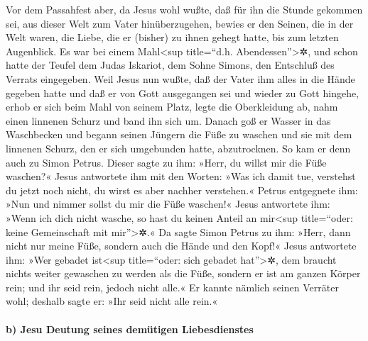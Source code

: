  Vor dem Passahfest aber, da Jesus wohl wußte, daß für ihn
die Stunde gekommen sei, aus dieser Welt zum Vater hinüberzugehen,
bewies er den Seinen, die in der Welt waren, die Liebe, die er (bisher)
zu ihnen gehegt hatte, bis zum letzten Augenblick.  Es war
bei einem Mahl\textless sup title=``d.h. Abendessen''\textgreater✲, und
schon hatte der Teufel dem Judas Iskariot, dem Sohne Simons, den
Entschluß des Verrats eingegeben.  Weil Jesus nun wußte,
daß der Vater ihm alles in die Hände gegeben hatte und daß er von Gott
ausgegangen sei und wieder zu Gott hingehe,  erhob er sich
beim Mahl von seinem Platz, legte die Oberkleidung ab, nahm einen
linnenen Schurz und band ihn sich um.  Danach goß er
Wasser in das Waschbecken und begann seinen Jüngern die Füße zu waschen
und sie mit dem linnenen Schurz, den er sich umgebunden hatte,
abzutrocknen.  So kam er denn auch zu Simon Petrus. Dieser
sagte zu ihm: »Herr, du willst mir die Füße waschen?« 
Jesus antwortete ihm mit den Worten: »Was ich damit tue, verstehst du
jetzt noch nicht, du wirst es aber nachher verstehen.« 
Petrus entgegnete ihm: »Nun und nimmer sollst du mir die Füße waschen!«
Jesus antwortete ihm: »Wenn ich dich nicht wasche, so hast du keinen
Anteil an mir\textless sup title=``oder: keine Gemeinschaft mit
mir''\textgreater✲.«  Da sagte Simon Petrus zu ihm: »Herr,
dann nicht nur meine Füße, sondern auch die Hände und den Kopf!«
 Jesus antwortete ihm: »Wer gebadet ist\textless sup
title=``oder: sich gebadet hat''\textgreater✲, dem braucht nichts weiter
gewaschen zu werden als die Füße, sondern er ist am ganzen Körper rein;
und ihr seid rein, jedoch nicht alle.«  Er kannte nämlich
seinen Verräter wohl; deshalb sagte er: »Ihr seid nicht alle rein.«

\hypertarget{b-jesu-deutung-seines-demuxfctigen-liebesdienstes}{%
\paragraph{b) Jesu Deutung seines demütigen
Liebesdienstes}\label{b-jesu-deutung-seines-demuxfctigen-liebesdienstes}}

